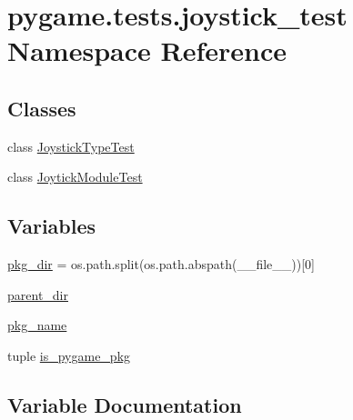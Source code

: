 \hypertarget{namespacepygame_1_1tests_1_1joystick__test}{}\section{pygame.\+tests.\+joystick\+\_\+test Namespace Reference}
\label{namespacepygame_1_1tests_1_1joystick__test}
\subsection*{Classes}
\begin{DoxyCompactItemize}
\item 
class \hyperlink{classpygame_1_1tests_1_1joystick__test_1_1_joystick_type_test}{Joystick\+Type\+Test}
\item 
class \hyperlink{classpygame_1_1tests_1_1joystick__test_1_1_joytick_module_test}{Joytick\+Module\+Test}
\end{DoxyCompactItemize}
\subsection*{Variables}
\begin{DoxyCompactItemize}
\item 
\hyperlink{namespacepygame_1_1tests_1_1joystick__test_a73cb0541a9dd3704bf4301a75b21aad2}{pkg\+\_\+dir} = os.\+path.\+split(os.\+path.\+abspath(\+\_\+\+\_\+file\+\_\+\+\_\+))\mbox{[}0\mbox{]}
\item 
\hyperlink{namespacepygame_1_1tests_1_1joystick__test_a5d195fd92e2efbcf6a9e032710d5ed43}{parent\+\_\+dir}
\item 
\hyperlink{namespacepygame_1_1tests_1_1joystick__test_a9531eb919b0a90c6af6ba67dfb8ee860}{pkg\+\_\+name}
\item 
tuple \hyperlink{namespacepygame_1_1tests_1_1joystick__test_acf1c241614efd14aea6651e90cdbaf2c}{is\+\_\+pygame\+\_\+pkg}
\end{DoxyCompactItemize}


\subsection{Variable Documentation}
\mbox{\label{namespacepygame_1_1tests_1_1joystick__test_acf1c241614efd14aea6651e90cdbaf2c}} 
